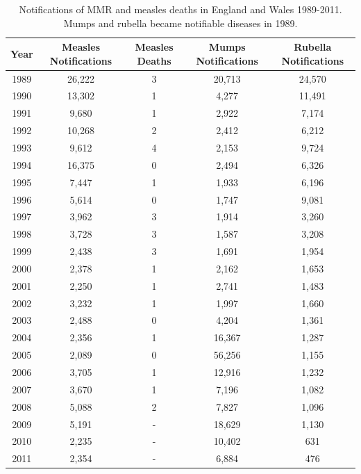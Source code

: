 \documentclass[a4paper,11pt] {scrartcl}
\begin{document}
\begin{table} [hp]
\centering
\begin{tabular}{c c c c c}
\toprule
Year & Measles Notifications & Measles Deaths & Mumps Notifications & Rubella Notifications\\ 
\midrule
1989 & 26,222 & 3 & 20,713 & 24,570\\ 
1990 & 13,302 & 1 & 4,277 & 11,491\\ 
1991 & 9,680 & 1 & 2,922 & 7,174\\ 
1992 & 10,268 & 2 & 2,412 & 6,212\\ 
1993 & 9,612 & 4 & 2,153 & 9,724\\ 
1994 & 16,375 & 0 & 2,494 & 6,326\\ 
1995 & 7,447 & 1 & 1,933 & 6,196\\ 
1996 & 5,614 & 0 & 1,747 & 9,081\\ 
1997 & 3,962 & 3 & 1,914 & 3,260\\ 
1998 & 3,728 & 3 & 1,587 & 3,208\\ 
1999 & 2,438 & 3 & 1,691 & 1,954\\ 
2000 & 2,378 & 1 & 2,162 & 1,653\\ 
2001 & 2,250 & 1 & 2,741 & 1,483\\ 
2002 & 3,232 & 1 & 1,997 & 1,660\\ 
2003 & 2,488 & 0 & 4,204 & 1,361\\ 
2004 & 2,356 & 1 & 16,367 & 1,287\\ 
2005 & 2,089 & 0 & 56,256 & 1,155\\ 
2006 & 3,705 & 1 & 12,916 & 1,232\\ 
2007 & 3,670 & 1 & 7,196 & 1,082\\ 
2008 & 5,088 & 2 & 7,827 & 1,096\\
2009 & 5,191 & - & 18,629 & 1,130\\
2010 & 2,235 & - & 10,402 & 631\\
2011 & 2,354 & - & 6,884 & 476\\
\bottomrule
\end{tabular}
\caption{Notifications of MMR and measles deaths in England and Wales 1989-2011\cite{hpameaslesnotificationsanddeaths,hpameaslesnotificationsbyage,hpamumpsnotificationsbyage,hparubellanotificationsbyage}. Mumps and rubella became notifiable diseases in 1989.}
\label{mmrnotifications}
\end{table}
\end{document}
